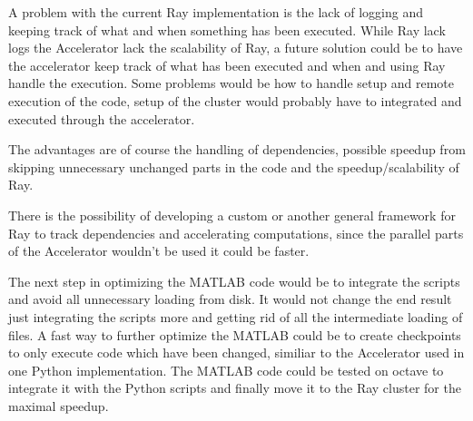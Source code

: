\documentclass[12pt, a4paper]{article}
\begin{document}
A problem with the current Ray implementation is the lack of logging and keeping track of what and when something has been executed.
While Ray lack logs the Accelerator lack the scalability of Ray, a future solution could be to have the accelerator keep track of what has been executed and when and using Ray handle the execution.
Some problems would be how to handle setup and remote execution of the code, setup of the cluster would probably have to integrated and executed through the accelerator.

The advantages are of course the handling of dependencies, possible speedup from skipping unnecessary unchanged parts in the code and the speedup/scalability of Ray.

There is the possibility of developing a custom or another general framework for Ray to track dependencies and accelerating computations, since the parallel parts of the Accelerator wouldn't be used it could be faster.

The next step in optimizing the MATLAB code would be to integrate the scripts and avoid all unnecessary loading from disk.
It would not change the end result just integrating the scripts more and getting rid of all the intermediate loading of files.
A fast way to further optimize the MATLAB could be to create checkpoints to only execute code which have been changed, similiar to the Accelerator used in one Python implementation.
The MATLAB code could be tested on octave to integrate it with the Python scripts and finally move it to the Ray cluster for the maximal speedup.





\newpage 
\end{document}
